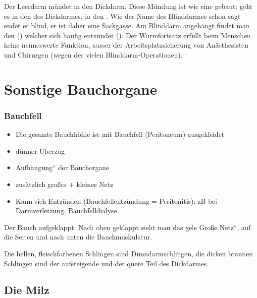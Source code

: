 Der Leerdarm m\"undet in den Dickdarm. Diese M\"undung ist wie eine
 gebaut:  geht es in den
 des Dickdarmes,  in
den . Wie der Name des Blinddarmes schon sagt
endet er blind, er ist daher eine Sackgasse. Am Blinddarm
angeh\"angt findet man den 
() welcher sich h\"aufig entz\"undet
(). Der Wurmfortsatz erf\"ullt beim
Menschen keine nenneswerte Funktion, ausser der
Arbeitsplatzsicherung von An\"asthesisten und Chirurgen
(wegen der vielen Blinddarm-Operationen).


\section{Sonstige Bauchorgane}

\subsubsection{Bauchfell}

\begin{itemize}
\item Die gesamte Bauchh\"ohle ist mit  Bauchfell
(Peritoneum) ausgekleidet

\item d\"unner \"Uberzug

\item {\quotedblbase}Aufh\"angung{\textquotedblleft} der Bauchorgane 

\item zus\"atzlich gro{\ss}es + kleines Netz

\item Kann sich Entz\"unden (Bauchfellentz\"undung = Peritonitis): zB
bei Darmverletzung, Bauchfelldialyse 

\end{itemize}


\gMarried
{Der Bauch {\quotedblbase}aufgeklappt: Nach oben geklappt sieht man das
gele {\quotedblbase}Gro{\ss}e Netz{\textquotedblleft}, auf die Seiten
und nach unten die Bauchmuskulatur. 

Die hellen, fleischfarbenen Schlingen sind D\"unndarmschlingen, die
dicken braunen Schlingen sind der aufsteigende und der quere Teil des
Dickdarmes.}
{}


\subsection{Die Milz} 

